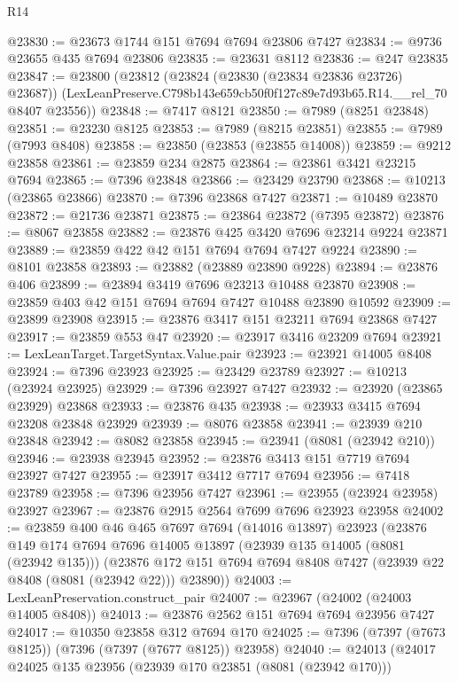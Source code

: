 \begin{lexlean}{R14}
\begin{coremodule}
@23830 := @23673 @1744 @151 @7694 @7694 @23806 @7427
@23834 := @9736 @23655 @435 @7694 @23806
@23835 := @23631 @8112
@23836 := @247 @23835
@23847 := @23800
    (@23812
      (@23824 (@23830 (@23834 @23836 @23726) @23687))
      (LexLeanPreserve.C798b143e659cb50f0f127c89e7d93b65.R14.__rel_70 @8407 @23556))
@23848 := @7417 @8121
@23850 := @7989 (@8251 @23848)
@23851 := @23230 @8125
@23853 := @7989 (@8215 @23851)
@23855 := @7989 (@7993 @8408)
@23858 := @23850 (@23853 (@23855 @14008))
@23859 := @9212 @23858
@23861 := @23859 @234 @2875
@23864 := @23861 @3421 @23215 @7694
@23865 := @7396 @23848
@23866 := @23429 @23790
@23868 := @10213 (@23865 @23866)
@23870 := @7396 @23868 @7427
@23871 := @10489 @23870
@23872 := @21736 @23871
@23875 := @23864 @23872 (@7395 @23872)
@23876 := @8067 @23858
@23882 := @23876 @425 @3420 @7696 @23214 @9224 @23871
@23889 := @23859 @422 @42 @151 @7694 @7694 @7427 @9224
@23890 := @8101 @23858
@23893 := @23882 (@23889 @23890 @9228)
@23894 := @23876 @406
@23899 := @23894 @3419 @7696 @23213 @10488 @23870
@23908 := @23859 @403 @42 @151 @7694 @7694 @7427 @10488 @23890 @10592
@23909 := @23899 @23908
@23915 := @23876 @3417 @151 @23211 @7694 @23868 @7427
@23917 := @23859 @553 @47
@23920 := @23917 @3416 @23209 @7694
@23921 := LexLeanTarget.TargetSyntax.Value.pair
@23923 := @23921 @14005 @8408
@23924 := @7396 @23923
@23925 := @23429 @23789
@23927 := @10213 (@23924 @23925)
@23929 := @7396 @23927 @7427
@23932 := @23920 (@23865 @23929) @23868
@23933 := @23876 @435
@23938 := @23933 @3415 @7694 @23208 @23848 @23929
@23939 := @8076 @23858
@23941 := @23939 @210 @23848
@23942 := @8082 @23858
@23945 := @23941 (@8081 (@23942 @210))
@23946 := @23938 @23945
@23952 := @23876 @3413 @151 @7719 @7694 @23927 @7427
@23955 := @23917 @3412 @7717 @7694
@23956 := @7418 @23789
@23958 := @7396 @23956 @7427
@23961 := @23955 (@23924 @23958) @23927
@23967 := @23876 @2915 @2564 @7699 @7696 @23923 @23958
@24002 := @23859
    @400
    @46
    @465
    @7697
    @7694
    (@14016 @13897)
    @23923
    (@23876
      @149
      @174
      @7694
      @7696
      @14005
      @13897
      (@23939 @135 @14005 (@8081 (@23942 @135)))
      (@23876 @172 @151 @7694 @7694 @8408 @7427 (@23939 @22 @8408 (@8081 (@23942 @22))) @23890))
@24003 := LexLeanPreservation.construct_pair
@24007 := @23967 (@24002 (@24003 @14005 @8408))
@24013 := @23876 @2562 @151 @7694 @7694 @23956 @7427
@24017 := @10350 @23858 @312 @7694 @170
@24025 := @7396 (@7397 (@7673 @8125)) (@7396 (@7397 (@7677 @8125)) @23958)
@24040 := @24013
    (@24017
      @24025
      @135
      @23956
      (@23939 @170 @23851 (@8081 (@23942 @170)))

\end{coremodule}
\end{lexlean}
